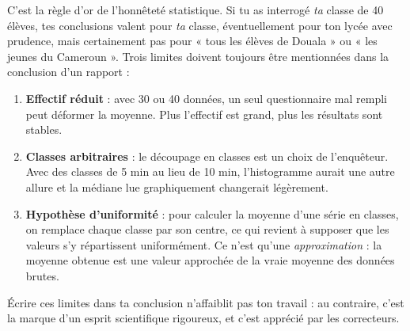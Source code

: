 \documentclass[11pt]{article}
\begin{document}
\begin{attention}
C'est la règle d'or de l'honnêteté statistique. Si tu as interrogé \emph{ta} classe de 40 élèves, tes conclusions valent pour \emph{ta} classe, éventuellement pour ton lycée avec prudence, mais certainement pas pour « tous les élèves de Douala » ou « les jeunes du Cameroun ». Trois limites doivent toujours être mentionnées dans la conclusion d'un rapport :
\begin{enumerate}
\item \textbf{Effectif réduit} : avec 30 ou 40 données, un seul questionnaire mal rempli peut déformer la moyenne. Plus l'effectif est grand, plus les résultats sont stables.
\item \textbf{Classes arbitraires} : le découpage en classes est un choix de l'enquêteur. Avec des classes de 5 min au lieu de 10 min, l'histogramme aurait une autre allure et la médiane lue graphiquement changerait légèrement.
\item \textbf{Hypothèse d'uniformité} : pour calculer la moyenne d'une série en classes, on remplace chaque classe par son centre, ce qui revient à supposer que les valeurs s'y répartissent uniformément. Ce n'est qu'une \emph{approximation} : la moyenne obtenue est une valeur approchée de la vraie moyenne des données brutes.
\end{enumerate}
Écrire ces limites dans ta conclusion n'affaiblit pas ton travail : au contraire, c'est la marque d'un esprit scientifique rigoureux, et c'est apprécié par les correcteurs.
\end{attention}
\end{document}

